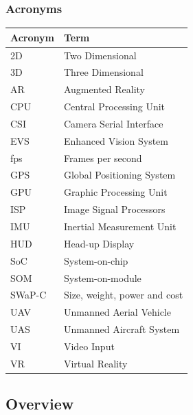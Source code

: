 \documentclass[letterpaper,10pt,serif,draftclsnofoot,onecolumn,compsoc,titlepage]{IEEEtran}
\begin{document}
\subsubsection{Acronyms}

\begin{tabular}{|l|l|}
	\hline
	\textbf{Acronym} & \textbf{Term}\\
	\hline
	2D & Two Dimensional\\
	\hline
	3D & Three Dimensional\\
	\hline
	AR & Augmented Reality\\
	\hline
	CPU & Central Processing Unit\\
	\hline
	CSI & Camera Serial Interface\\
	\hline
	EVS & Enhanced Vision System\\
	\hline
	fps & Frames per second\\
	\hline
	GPS & Global Positioning System\\
	\hline
	GPU & Graphic Processing Unit\\
	\hline
	ISP & Image Signal Processors\\
	\hline
	IMU & Inertial Measurement Unit\\
	\hline
	HUD & Head-up Display\\
	\hline
	SoC & System-on-chip\\
	\hline
	SOM & System-on-module\\
	\hline
	SWaP-C & Size, weight, power and cost\\
	\hline
	UAV & Unmanned Aerial Vehicle\\
	\hline
	UAS & Unmanned Aircraft System\\
	\hline
	VI & Video Input\\
	\hline
	VR & Virtual Reality\\
	\hline
\end{tabular}





\subsection{Overview}
\end{document}
